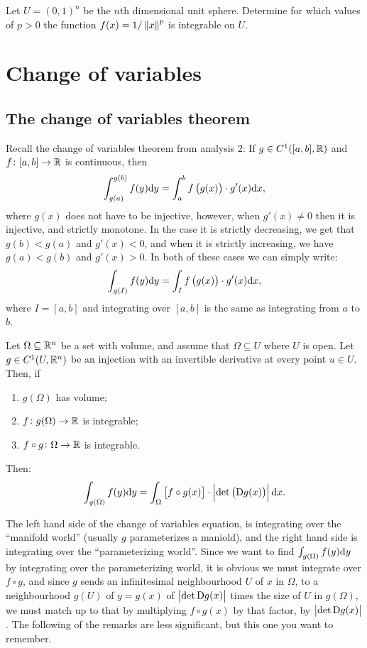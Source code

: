 \documentclass[11pt,a4paper]{article}
\begin{document}
\begin{exercise}
  Let $U = (0,1)^n$ be the $n$th dimensional unit sphere.
  Determine for which values of $p > 0$ the function
  $f(x) = 1 / \left\lVert x\right\rVert^p$ is integrable on $U$.
\end{exercise}

\newpage

\section{Change of variables}
\subsection{The change of variables theorem}
\begin{remark}
  Recall the change of variables theorem from analysis $2$:
  If $g \in C^1([a,b],\mathbb{R})$ and $f \colon [a,b] \to \mathbb{R}$ is continuous,
  then
  \[
    \int_{g(a)}^{g(b)} f(y) \dy =
    \int_{a}^{b} f\del{g(x)} \cdot g'(x) \dx,
  \]
  where $g(x)$ does not have to be injective,
  however, when $g'(x) \neq 0$ then it is injective, and strictly
  monotone.
  In the case it is strictly decreasing, we get that $g(b) < g(a)$
  and $g'(x) < 0$, and when it is strictly increasing,
  we have $g(a) < g(b)$ and $g'(x) > 0$.
  In both of these cases we can simply write:
  \[
    \int_{g(I)} f(y) \dy =
    \int_{I} f\del{g(x)} \cdot g'(x) \dx,
  \]
  where $I = [a,b]$ and integrating over $[a,b]$ is the same as integrating
  from $a$ to $b$.
\end{remark}
\begin{theorem}
  Let $\Omega \subseteq \mathbb{R}^n$ be a set with volume,
  and assume that $\Omega \subseteq U$ where $U$ is open.
  Let $g \in C^1(U,\mathbb{R}^n)$ be an injection with an invertible derivative
  at every point $u \in U$.
  Then, if
  \begin{enumerate}
    \item[(1)] $g(\Omega)$ has volume;
    \item[(2)] $f \colon g(\Omega) \to \mathbb{R}$ is integrable;
    \item[(3)] $f \circ g \colon \Omega \to \mathbb{R}$ is integrable.
  \end{enumerate}
  Then:
  \[
    \int_{g(\Omega)} f(y) \dy =
    \int_{\Omega} \left[f \circ g(x)\right] \cdot
      \abs{\det\del{\Dif g(x)}} \dx.
  \]
\end{theorem}
\begin{remark}
  \label{rmk:change-of-variables-intuition}
  The left hand side of the change of variables equation,
  is integrating over the ``manifold world''
  (usually $g$ parameterizes a maniold),
  and the right hand side is integrating over the ``parameterizing world''.
  Since we want to find $\int_{g(\Omega)} f(y) \dy$
  by integrating over the parameterizing world,
  it is obvious we must integrate over $f \circ g$,
  and since $g$ sends an infinitesimal neighbourhood $U$ of $x$ in $\Omega$,
  to a neighbourhood $g(U)$ of $y = g(x)$ of
  $\left\lvert\det{\mathrm{D}g(x)}\right\rvert$ times the size of $U$ in $g(\Omega)$,
  we must match up to that by multiplying $f \circ g(x)$ by that factor,
  by $\left\lvert\det{\mathrm{D}g(x)}\right\rvert$.
  The following of the remarks are less significant,
  but this one you want to remember.
\end{remark}
\end{document}
